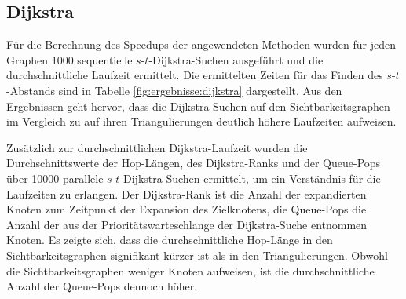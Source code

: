 \subsection{Dijkstra}

Für die Berechnung des Speedups der angewendeten Methoden wurden für jeden Graphen \num{1000} sequentielle $s$-$t$-Dijkstra-Suchen ausgeführt und die durchschnittliche Laufzeit ermittelt.
Die ermittelten Zeiten für das Finden des $s$-$t$-Abstands sind in Tabelle \ref{fig:ergebnisse:dijkstra} dargestellt.
Aus den Ergebnissen geht hervor, dass die Dijkstra-Suchen auf den Sichtbarkeitsgraphen im Vergleich zu auf ihren Triangulierungen deutlich höhere Laufzeiten aufweisen.

Zusätzlich zur durchschnittlichen Dijkstra-Laufzeit wurden die Durchschnittswerte der Hop-Längen, des Dijkstra-Ranks und der Queue-Pops über \num{10000} parallele $s$-$t$-Dijkstra-Suchen ermittelt, um ein Verständnis für die Laufzeiten zu erlangen.
Der Dijkstra-Rank ist die Anzahl der expandierten Knoten zum Zeitpunkt der Expansion des Zielknotens, die Queue-Pops die Anzahl der aus der Prioritätswarteschlange der Dijkstra-Suche entnommen Knoten.
Es zeigte sich, dass die durchschnittliche Hop-Länge in den Sichtbarkeitsgraphen signifikant kürzer ist als in den Triangulierungen.
Obwohl die Sichtbarkeitsgraphen weniger Knoten aufweisen, ist die durchschnittliche Anzahl der Queue-Pops dennoch höher.

